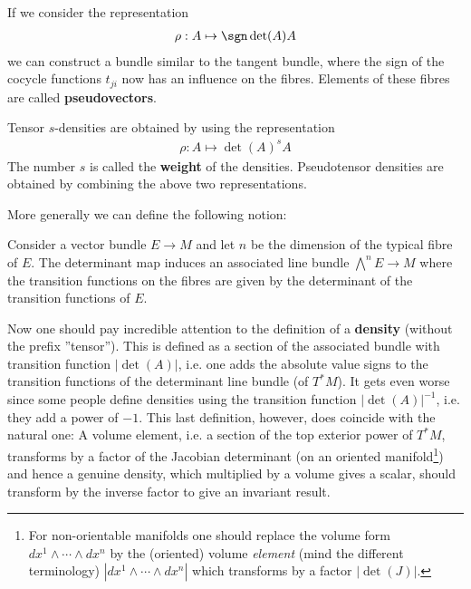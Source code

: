     \begin{example}[Pseudovectors]
        If we consider the representation
        \begin{gather}
            \rho:A\mapsto \sgn\det(A)A
        \end{gather}
        we can construct a bundle similar to the tangent bundle, where the sign of the cocycle functions $t_{ji}$ now has an influence on the fibres. Elements of these fibres are called \textbf{pseudovectors}.
    \end{example}
    \begin{example}
        Tensor $s$-densities are obtained by using the representation
        \begin{gather}
            \rho:A\mapsto \det(A)^sA
        \end{gather}
        The number $s$ is called the \textbf{weight} of the densities. Pseudotensor densities are obtained by combining the above two representations.
    \end{example}

    More generally we can define the following notion:
    \begin{construct}
        Consider a vector bundle $E\rightarrow M$ and let $n$ be the dimension of the typical fibre of $E$. The determinant map induces an associated line bundle $\bigwedge^nE\rightarrow M$ where the transition functions on the fibres are given by the determinant of the transition functions of $E$.
    \end{construct}

    \begin{remark}[Densities]
        Now one should pay incredible attention to the definition of a \textbf{density} (without the prefix ''tensor''). This is defined as a section of the associated bundle with transition function $|\det(A)|$, i.e. one adds the absolute value signs to the transition functions of the determinant line bundle (of $T^*M$). It gets even worse since some people define densities using the transition function $|\det(A)|^{-1}$, i.e. they add a power of $-1$. This last definition, however, does coincide with the natural one: A volume element, i.e. a section of the top exterior power of $T^*M$, transforms by a factor of the Jacobian determinant (on an oriented manifold\footnote{For non-orientable manifolds one should replace the volume form $dx^1\wedge\cdots\wedge dx^n$ by the (oriented) volume \textit{element} (mind the different terminology) $|dx^1\wedge\cdots\wedge dx^n|$ which transforms by a factor $|\det(J)|$.}) and hence a genuine density, which multiplied by a volume gives a scalar, should transform by the inverse factor to give an invariant result.
    \end{remark}

